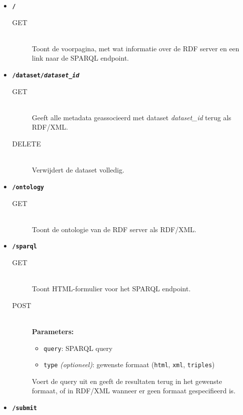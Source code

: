 \documentclass[a4paper]{article}
\begin{document}
\begin{itemize}
  \item {\tt\large\bf /}
    \begin{description}
      \item[GET] \hfill \\
        Toont de voorpagina, met wat informatie over de \gls{RDF} server en een
        link naar de \gls{SPARQL} endpoint.
    \end{description}
  \item {\tt\large\bf /dataset/{\it dataset\_id}}
    \begin{description}
      \item[GET] \hfill \\
        Geeft alle metadata geassocieerd met dataset {\it dataset\_id} terug
        als \gls{RDF}/\gls{XML}.
      \item[DELETE] \hfill \\
        Verwijdert de dataset volledig.
    \end{description}
  \item {\tt\large\bf /ontology}
    \begin{description}
      \item[GET] \hfill \\
        Toont de ontologie van de \gls{RDF} server als \gls{RDF}/\gls{XML}.
    \end{description}
  \item {\tt\large\bf /sparql}
    \begin{description}
      \item[GET] \hfill \\
        Toont \gls{HTML}-formulier voor het \gls{SPARQL} endpoint.
      \item[POST] \hfill \\
        {\bf Parameters:}
        \begin{itemize}
          \item {\tt query}: \gls{SPARQL} query
          \item {\tt type} {\it (optioneel)}: gewenste formaat ({\tt html},
                {\tt xml}, {\tt triples})
        \end{itemize}
        Voert de query uit en geeft de resultaten terug in het gewenste formaat,
        of in \gls{RDF}/\gls{XML} wanneer er geen formaat gespecifieerd is.
    \end{description}
  \item {\tt\large\bf /submit}
    \begin{description}

\end{description}
\end{itemize}
\end{document}
